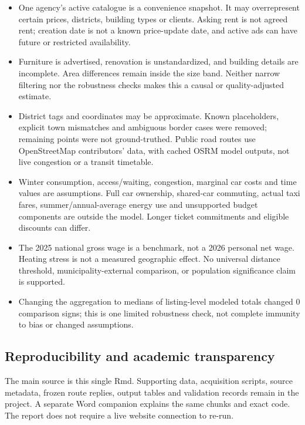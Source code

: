 \documentclass[
]{article}
\providecommand{\tightlist}{%
  \setlength{\itemsep}{0pt}\setlength{\parskip}{0pt}}
\begin{document}
\begin{itemize}
\tightlist
\item
  One agency's active catalogue is a convenience snapshot. It may
  overrepresent certain prices, districts, building types or clients.
  Asking rent is not agreed rent; creation date is not a known
  price-update date, and active ads can have future or restricted
  availability.
\item
  Furniture is advertised, renovation is unstandardized, and building
  details are incomplete. Area differences remain inside the size band.
  Neither narrow filtering nor the robustness checks makes this a causal
  or quality-adjusted estimate.
\item
  District tags and coordinates may be approximate. Known placeholders,
  explicit town mismatches and ambiguous border cases were removed;
  remaining points were not ground-truthed. Public road routes use
  OpenStreetMap contributors' data, with cached OSRM model outputs, not
  live congestion or a transit timetable.
\item
  Winter consumption, access/waiting, congestion, marginal car costs and
  time values are assumptions. Full car ownership, shared-car commuting,
  actual taxi fares, summer/annual-average energy use and unsupported
  budget components are outside the model. Longer ticket commitments and
  eligible discounts can differ.
\item
  The 2025 national gross wage is a benchmark, not a 2026 personal net
  wage. Heating stress is not a measured geographic effect. No universal
  distance threshold, municipality-external comparison, or population
  significance claim is supported.
\item
  Changing the aggregation to medians of listing-level modeled totals
  changed 0 comparison signs; this is one limited robustness check, not
  complete immunity to bias or changed assumptions.
\end{itemize}

\subsection{Reproducibility and academic
transparency}\label{reproducibility-and-academic-transparency}

The main source is this single Rmd. Supporting data, acquisition
scripts, source metadata, frozen route replies, output tables and
validation records remain in the project. A separate Word companion
explains the same chunks and exact code. The report does not require a
live website connection to re-run.
\end{document}

